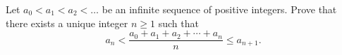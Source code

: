 \begin{problem}
    Let $a_0 < a_1 < a_2 < \dots$ be an infinite sequence of positive integers. Prove that there exists a unique integer $n\geq 1$ such that
\[a_n < \frac{a_0+a_1+a_2+\cdots+a_n}{n} \leq a_{n+1}.\]
    \label{14IMO1}
\end{problem}